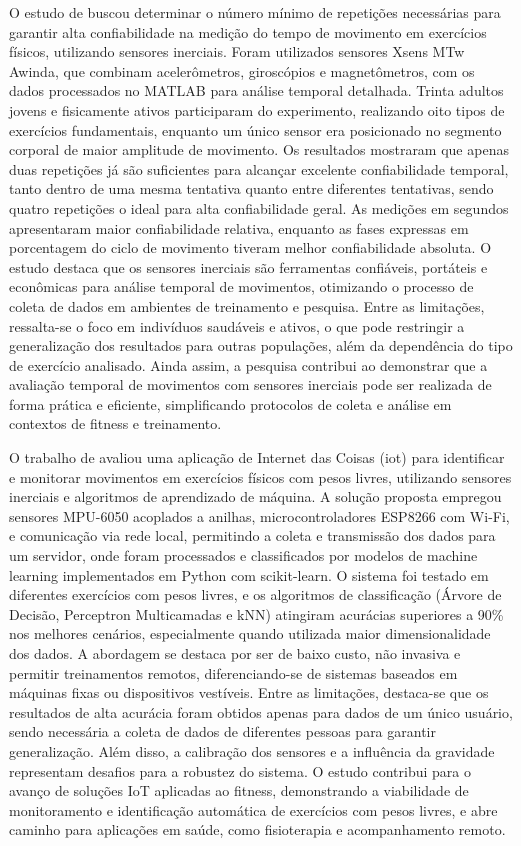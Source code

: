 O estudo de  buscou determinar o número mínimo de repetições necessárias para garantir alta confiabilidade na medição do tempo de movimento em exercícios físicos, utilizando sensores inerciais. Foram utilizados sensores Xsens MTw Awinda, que combinam acelerômetros, giroscópios e magnetômetros, com os dados processados no MATLAB para análise temporal detalhada. Trinta adultos jovens e fisicamente ativos participaram do experimento, realizando oito tipos de exercícios fundamentais, enquanto um único sensor era posicionado no segmento corporal de maior amplitude de movimento. Os resultados mostraram que apenas duas repetições já são suficientes para alcançar excelente confiabilidade temporal, tanto dentro de uma mesma tentativa quanto entre diferentes tentativas, sendo quatro repetições o ideal para alta confiabilidade geral. As medições em segundos apresentaram maior confiabilidade relativa, enquanto as fases expressas em porcentagem do ciclo de movimento tiveram melhor confiabilidade absoluta. O estudo destaca que os sensores inerciais são ferramentas confiáveis, portáteis e econômicas para análise temporal de movimentos, otimizando o processo de coleta de dados em ambientes de treinamento e pesquisa. Entre as limitações, ressalta-se o foco em indivíduos saudáveis e ativos, o que pode restringir a generalização dos resultados para outras populações, além da dependência do tipo de exercício analisado. Ainda assim, a pesquisa contribui ao demonstrar que a avaliação temporal de movimentos com sensores inerciais pode ser realizada de forma prática e eficiente, simplificando protocolos de coleta e análise em contextos de fitness e treinamento.

O trabalho de  avaliou uma aplicação de Internet das Coisas (\gls{iot}) para identificar e monitorar movimentos em exercícios físicos com pesos livres, utilizando sensores inerciais e algoritmos de aprendizado de máquina. A solução proposta empregou sensores MPU-6050 acoplados a anilhas, microcontroladores ESP8266 com Wi-Fi, e comunicação via rede local, permitindo a coleta e transmissão dos dados para um servidor, onde foram processados e classificados por modelos de machine learning implementados em Python com scikit-learn. O sistema foi testado em diferentes exercícios com pesos livres, e os algoritmos de classificação (Árvore de Decisão, Perceptron Multicamadas e kNN) atingiram acurácias superiores a 90\% nos melhores cenários, especialmente quando utilizada maior dimensionalidade dos dados. A abordagem se destaca por ser de baixo custo, não invasiva e permitir treinamentos remotos, diferenciando-se de sistemas baseados em máquinas fixas ou dispositivos vestíveis. Entre as limitações, destaca-se que os resultados de alta acurácia foram obtidos apenas para dados de um único usuário, sendo necessária a coleta de dados de diferentes pessoas para garantir generalização. Além disso, a calibração dos sensores e a influência da gravidade representam desafios para a robustez do sistema. O estudo contribui para o avanço de soluções IoT aplicadas ao fitness, demonstrando a viabilidade de monitoramento e identificação automática de exercícios com pesos livres, e abre caminho para aplicações em saúde, como fisioterapia e acompanhamento remoto.

